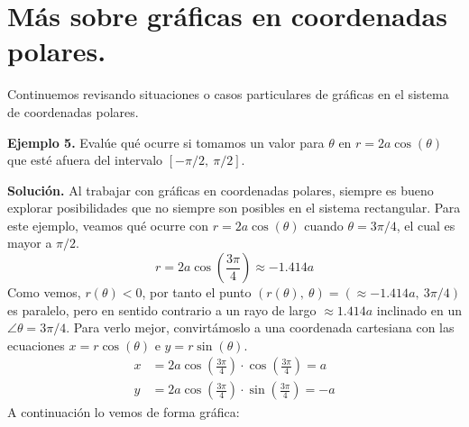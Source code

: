 \documentclass[12pt]{article}
\begin{document}
\section{Más sobre gráficas en coordenadas polares.}

Continuemos revisando situaciones o casos particulares de gráficas en el sistema de coordenadas polares.

\textbf{Ejemplo 5.} Evalúe qué ocurre si tomamos un valor para $\theta$ en $r = 2a \cos(\theta)$ que esté afuera del intervalo $[-\pi/2, \ \pi/2]$.

\textbf{Solución.} Al trabajar con gráficas en coordenadas polares, siempre es bueno explorar posibilidades que no siempre son posibles en el sistema rectangular. Para este ejemplo, veamos qué ocurre con $r = 2a \cos(\theta)$ cuando $\theta = 3\pi/4$, el cual es mayor a $\pi/2$.
\[
  r = 2a \cos\left(\frac{3\pi}{4}\right) \approx -1.414 a
\]
Como vemos, $r(\theta) < 0$, por tanto el punto $(r(\theta), \ \theta) = (\approx -1.414a, \ 3\pi/4)$ es paralelo, pero en sentido contrario a un rayo de largo $\approx 1.414 a$ inclinado en un $\angle \theta = 3\pi/4$. Para verlo mejor, convirtámoslo a una coordenada cartesiana con las ecuaciones $x = r \cos(\theta)$ e $y = r \sin(\theta)$.
\begin{align*}
x &= 2a \cos\left(\frac{3\pi}{4}\right) \cdot \cos\left(\frac{3\pi}{4}\right) = a \\
y &= 2a \cos\left(\frac{3\pi}{4}\right) \cdot \sin\left(\frac{3\pi}{4}\right) = -a
\end{align*}
A continuación lo vemos de forma gráfica:

\begin{figure}[hbt!]
\centering


\end{figure}
\end{document}
